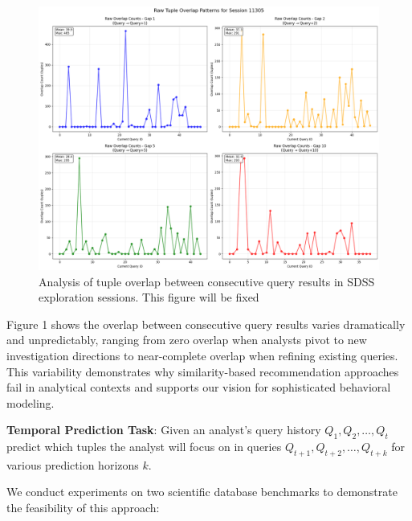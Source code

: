 \documentclass[sigconf, nonacm]{acmart}
\begin{document}
\label{fig:overlap-analysis}
\begin{figure}
\centering
\includegraphics[scale=0.2]{figures/Overlap-analysis.png} 
\caption{Analysis of tuple overlap between consecutive query results in SDSS exploration sessions. This figure will be fixed}
\end{figure}

Figure 1 shows the overlap between consecutive query results varies dramatically and unpredictably, ranging from zero overlap when analysts pivot to new investigation directions to near-complete overlap when refining existing queries. This variability demonstrates why similarity-based recommendation approaches fail in analytical contexts and supports our vision for sophisticated behavioral modeling.


\textbf{Temporal Prediction Task}: Given an analyst's query history $Q_1, Q_2, \ldots, Q_t$ predict which tuples the analyst will focus on in queries $Q_{t+1}, Q_{t+2}, \ldots, Q_{t+k}$ for various prediction horizons $k$.

We conduct experiments on two scientific database benchmarks to demonstrate the feasibility of this approach:
\end{document}
